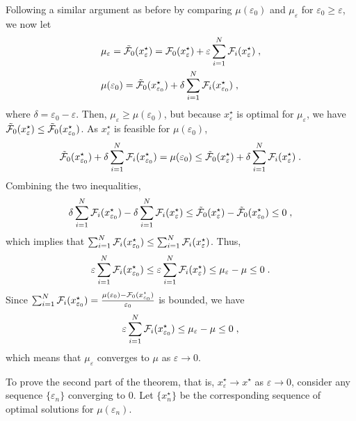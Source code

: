 \documentclass[journal,twoside,web]{ieeecolor}
\begin{document}
Following a similar argument as before by comparing $\mu(\varepsilon_0)$ and $\mu_\varepsilon$ for $\varepsilon_0\geq \varepsilon$, we now let 
\begin{align*}
&\mu_\varepsilon=\tilde{{\cal F}}_0(x^\star_\varepsilon)={\cal F}_0(x^\star_\varepsilon)+\varepsilon\sum_{i=1}^N{\cal F}_i(x^\star_\varepsilon)\;,\\
&\mu(\varepsilon_0)=\tilde{{\cal F}}_0(x^\star_{\varepsilon_0})+\delta\sum_{i=1}^N{\cal F}_i(x^\star_{\varepsilon_0})\;,
\end{align*}
where $\delta=\varepsilon_0-\varepsilon$. Then, $\mu_\varepsilon\geq \mu(\varepsilon_0)$\;,
but because $x_\varepsilon^\star$ is optimal for $\mu_\varepsilon$\;, we have
$\tilde{{\cal F}}_0(x^\star_\varepsilon)\leq \tilde{{\cal F}}_0(x^\star_{\varepsilon_0})$. 
As $x^\star_\varepsilon$ is feasible for $\mu(\varepsilon_0)$, \begin{align*}
\tilde{{\cal F}}_0(x^\star_{\varepsilon_0})+\delta\sum_{i=1}^N{\cal F}_i(x^\star_{\varepsilon_0})=\mu(\varepsilon_0)\leq \tilde{{\cal F}}_0(x^\star_{\varepsilon})+\delta\sum_{i=1}^N{\cal F}_i(x^\star_{\varepsilon})\;.
\end{align*}
Combining the two inequalities,
\begin{align*}
\delta\sum_{i=1}^N{\cal F}_i(x^\star_{\varepsilon_0})-\delta\sum_{i=1}^N{\cal F}_i(x^\star_{\varepsilon})\leq \tilde{{\cal F}}_0(x^\star_{\varepsilon})-\tilde{{\cal F}}_0(x^\star_{\varepsilon_0})\leq 0\;,
\end{align*}
which implies that $\sum_{i=1}^N{\cal F}_i(x^\star_{\varepsilon_0})\leq \sum_{i=1}^N{\cal F}_i(x^\star_{\varepsilon})$. Thus, 
\begin{equation}\label{limi.eq}
\varepsilon\sum_{i=1}^N{\cal F}_{i}(x_{\varepsilon_0}^\star)\leq
\varepsilon\sum_{i=1}^N{\cal F}_{i}(x_{\varepsilon}^\star)\leq 
\mu_\varepsilon-\mu \leq 0\;.
\end{equation}
Since $\sum_{i=1}^N{\cal F}_{i}(x_{\varepsilon_0}^\star)=\frac{\mu(\varepsilon_0)-{\cal F}_0(x^\star_{\varepsilon_0})}{\varepsilon_0}$ is bounded, we have
\begin{equation}\label{limi2.eq}
\varepsilon\sum_{i=1}^N{\cal F}_{i}(x_{\varepsilon_0}^\star)\leq 
\mu_\varepsilon-\mu\leq 0\;,
\end{equation}
which means that $\mu_\varepsilon$ converges to $\mu$ as $\varepsilon\to 0$.

To prove the second part of the theorem, that is, $x^\star_\varepsilon \to x^\star$ as $\varepsilon \to 0$, consider any sequence $\{\varepsilon_n\}$ converging to $0$. Let $\{x^\star_{n}\}$ be the corresponding sequence of optimal solutions for $\mu(\varepsilon_n)$. 
\end{document}
